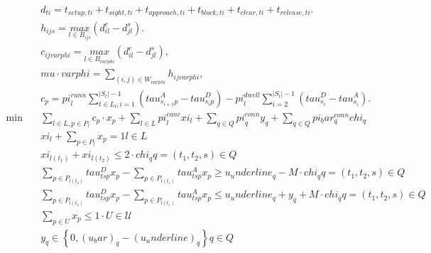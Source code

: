 \begin{align}
  & d_{t i} = t_{s e t u p , t i} + t_{s i g h t , t i} + t_{a p p r o a c h , t i} + t_{b l o c k , t i} + t_{c l e a r , t i} + t_{r e l e a s e , t i} . \tag{eq\_0001} \\
  & h_{i j s} = \underset{l \in B_{i j s}}{max} \left(d_{i l}^{e} - d_{j l}^{s}\right) . \tag{eq\_0002} \\
  & c_{i j \mathit{varphi}} = \underset{l \in B_{\mathit{varphi}}}{max} \left(d_{i l}^{e} - d_{j l}^{s}\right) , \tag{eq\_0003} \\
  & \mathit{mu} \cdot \mathit{varphi} = \sum_{\left(i , j\right) \in W_{\mathit{varphi}}} h_{i j \mathit{varphi}} , \tag{eq\_0004} \\
  & c_{p} = \mathit{pi}_{l}^{r u n n} \sum_{t \in L_{l}, i = 1} ^{\left|S_{t}\right| - 1} \left(\mathit{tau}_{s_{i + 1} p}^{A} - \mathit{tau}_{s_{i} p}^{D}\right) - \mathit{pi}_{l}^{d w e l l} \sum_{i = 2}^{\left|S_{t}\right| - 1} \left(\mathit{tau}_{s_{i}}^{D} - \mathit{tau}_{s_{i}}^{A}\right) . \tag{eq\_0005} \\
  \min\quad & \sum_{l \in L, p \in P_{l}} c_{p} \cdot x_{p} + \sum_{l \in L} \mathit{pi}_{l}^{c a n c} \mathit{xi}_{l} + \sum_{q \in Q} \mathit{pi}_{q}^{c o n n} y_{q} + \sum_{q \in Q} pi_bar_{q}^{c o n n} \mathit{chi}_{q} \tag{eq\_0006} \\
  & \mathit{xi}_{l} + \sum_{p \in P_{l}} x_{p} = 1 l \in L \tag{eq\_0007} \\
  & \mathit{xi}_{l \left(t_{1}\right)} + \mathit{xi}_{l \left(t_{2}\right)} \leq 2 \cdot \mathit{chi}_{q} q = \left(t_{1} , t_{2} , s\right) \in Q \tag{eq\_0008} \\
  & \underset{p \in P_{l \left(t_{2}\right)}}{\sum} \mathit{tau}_{t s p}^{D} x_{p} - \underset{p \in P_{l \left(t_{1}\right)}}{\sum} \mathit{tau}_{t s p}^{A} x_{p} \geq u_underline_{q} - M \cdot \mathit{chi}_{q} q = \left(t_{1} , t_{2} , s\right) \in Q \tag{eq\_0009} \\
  & \underset{p \in P_{l \left(t_{2}\right)}}{\sum} \mathit{tau}_{t s p}^{D} x_{p} - \underset{p \in P_{l \left(t_{1}\right)}}{\sum} \mathit{tau}_{t s p}^{A} x_{p} \leq u_underline_{q} + y_{q} + M \cdot \mathit{chi}_{q} q = \left(t_{1} , t_{2} , s\right) \in Q \tag{eq\_0010} \\
  & \sum_{p \in U} x_{p} \leq 1 \cdot U \in \mathcal{U} \tag{eq\_0011} \\
  & y_{q} \in \left\{0 , \left(u_bar\right)_{q} - \left(u_underline\right)_{q}\right\} q \in Q \tag{eq\_0014} \\
\end{align}

